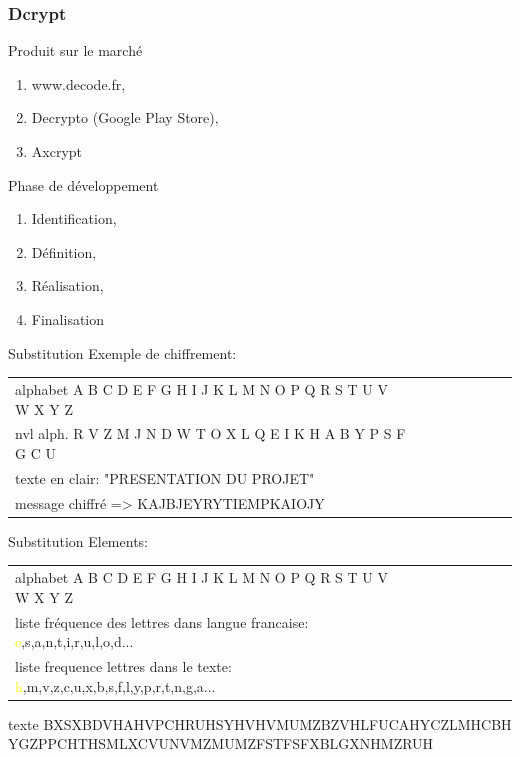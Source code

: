 \documentclass[10pt,xcolor=table]{beamer}
\begin{document}
\begin{frame}[<+->]
  \frametitle{Dcrypt}
  
  \begin{exampleblock}{Produit sur le marché}
	\begin{enumerate}
    \item www.decode.fr,
    \item Decrypto (Google Play Store),
    \item Axcrypt
    \end{enumerate}
  \end{exampleblock}

  \begin{block}{Phase de développement}
   
    \begin{enumerate}
    \item Identification,
    \item Définition,
    \item Réalisation,
    \item Finalisation
    \end{enumerate}
  \end{block}

\end{frame}
\begin{frame}
\begin{exampleblock}{Substitution} %
Exemple de chiffrement:
\begin{tabular}{l!{\vrule}ccccccc} 
alphabet A B C D E F G H I J K L M N O P Q R S T U V W X Y Z \pause \\  
nvl alph. R V Z M J N D W T O X L Q E I K H A B Y P S F G C U  \pause \\ 
texte en clair: "PRESENTATION DU PROJET" \pause  \\ 
message chiffré => KAJBJEYRYTIEMPKAIOJY \\
\end{tabular}
\end{exampleblock}
\end{frame}




\begin{frame}
\begin{exampleblock}{Substitution} %
Elements:
\begin{tabular}{l!{\vrule}ccccccc} 
alphabet A B C D E F G H I J K L M N O P Q R S T U V W X Y Z \\   
liste fréquence des lettres dans langue francaise: \textcolor{yellow}{e},s,a,n,t,i,r,u,l,o,d...\\ 
liste frequence lettres dans le texte: \textcolor{yellow}{h},m,v,z,c,u,x,b,s,f,l,y,p,r,t,n,g,a...
\end{tabular}
\end{exampleblock}
\begin{exampleblock}{texte}
BXSXBDVHAHVPCHRUHSYHVHVMUMZBZVHLFUCAHYCZLMHCBH
YGZPPCHTHSMLXCVUNVMZMUMZFSTFSFXBLGXNHMZRUH
\end{exampleblock}
\end{frame}
\end{document}
